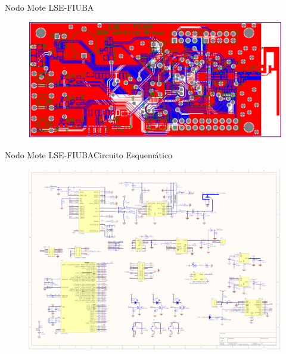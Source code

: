\documentclass[aspectratio=169]{beamer}
\begin{document}
\begin{frame}{Nodo Mote LSE-FIUBA}
\begin{minipage}[c]{1.0\linewidth}
\begin{minipage}[c]{0.35\linewidth}
\begin{figure}[H]
			\includegraphics[width=1\textwidth]{./imagenes/motePCB}
			\label{Mote LSE}
		\end{figure}	  	  	
	\end{minipage}
\end{minipage}
\end{frame}


\begin{frame}{Nodo Mote LSE-FIUBA}{Circuito Esquemático}
	\begin{figure}[H]
		\includegraphics[height=.95\textheight]{./imagenes/moteSchema}
	\end{figure}	  	  	
\end{frame}



\end{document}
